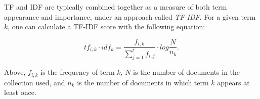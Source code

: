 TF and IDF are typically combined together as a measure of both term appearance and importance, under an approach called \emph{TF-IDF}. For a given term $k$, one can calculate a TF-IDF score with the following equation:

\begin{equation*}
tf_{i,k} \cdot idf_{k} = \frac{f_{i,k}}{\sum_{j=1}^{t} f_{i,j}} \cdot log \frac{N}{n_k}.
\end{equation*}

Above, $f_{i,k}$ is the frequency of term $k$, $N$ is the number of documents in the collection used, and $n_k$ is the number of documents in which term $k$ appears at least once.

%
%
